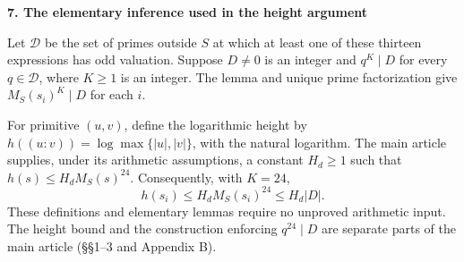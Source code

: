 \documentclass[11pt]{article}
\newcommand{\heading}[1]{\vspace{4pt}\textbf{#1}\par\vspace{-3pt}}
\begin{document}
\heading{7. The elementary inference used in the height argument}
Let $\mathcal D$ be the set of primes outside $S$ at which at least one of these thirteen expressions has odd valuation. Suppose $D\ne0$ is an integer and $q^K\mid D$ for every $q\in\mathcal D$, where $K\ge1$ is an integer. The lemma and unique prime factorization give $M_S(s_i)^K\mid D$ for each $i$.

For primitive $(u,v)$, define the logarithmic height by $h((u:v))=\log\max\{|u|,|v|\}$, with the natural logarithm. The main article supplies, under its arithmetic assumptions, a constant $H_d\ge1$ such that $h(s)\le H_d M_S(s)^{24}$. Consequently, with $K=24$,
\[
h(s_i)\le H_d M_S(s_i)^{24}\le H_d|D|.
\]
These definitions and elementary lemmas require no unproved arithmetic input. The height bound and the construction enforcing $q^{24}\mid D$ are separate parts of the main article (\S\S1--3 and Appendix B).
\end{document}
